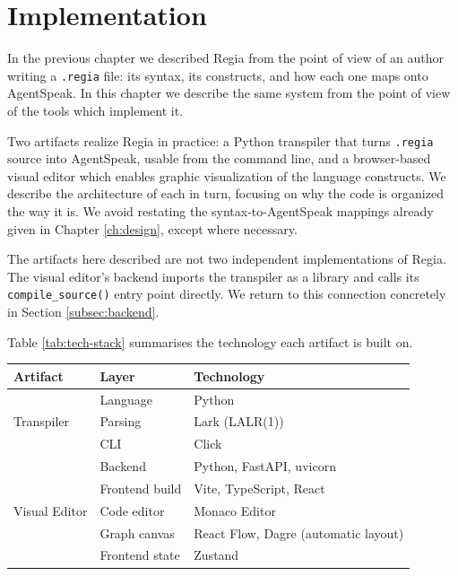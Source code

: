 \chapter{Implementation}
\label{ch:implementation}

In the previous chapter we described Regia from the point of view of an author writing a \lstinline|.regia| file: its syntax, its constructs, and how each one maps onto AgentSpeak. In this chapter we describe the same system from the point of view of the tools which implement it. 

Two artifacts realize Regia in practice: a Python transpiler that turns \lstinline|.regia| source into AgentSpeak, usable from the command line, and a browser-based visual editor which enables graphic visualization of the language constructs. We describe the architecture of each in turn, focusing on why the code is organized the way it is. We avoid restating the syntax-to-AgentSpeak mappings already given in Chapter \ref{ch:design}, except where necessary.

The artifacts here described are not two independent implementations of Regia. The visual editor's backend imports the transpiler as a library and calls its \lstinline|compile_source()| entry point directly. We return to this connection concretely in Section \ref{subsec:backend}.

Table \ref{tab:tech-stack} summarises the technology each artifact is built on.

\begin{center}
\begin{tabular}{|l|l|l|}
\hline
\textbf{Artifact} & \textbf{Layer} & \textbf{Technology} \\
\hline
\multirow{3}{*}{Transpiler} & Language & Python \\
                            & Parsing  & Lark (LALR(1)) \\
                            & CLI      & Click \\
\hline
\multirow{5}{*}{Visual Editor} & Backend           & Python, FastAPI, uvicorn \\
                                & Frontend build    & Vite, TypeScript, React \\
                                & Code editor       & Monaco Editor \\
                                & Graph canvas       & React Flow, Dagre (automatic layout) \\
                                & Frontend state     & Zustand \\
\hline
\end{tabular}
\end{center}
\label{tab:tech-stack}

